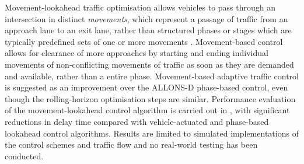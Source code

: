 Movement-lookahead traffic optimisation allows vehicles to pass through an intersection in distinct \emph{movements}, which represent a passage of traffic from an approach lane to an exit lane, rather than structured phases or stages which are typically predefined sets of one or more movements  \cite{van2008movement,pandit2013adaptive}. Movement-based control allows for clearance of more approaches by starting and ending individual movements of non-conflicting movements of traffic as soon as they are demanded and available, rather than a entire phase. Movement-based adaptive traffic control is suggested as an improvement over the ALLONS-D phase-based control, even though the rolling-horizon optimisation steps are similar. Performance evaluation of the movement-lookahead control algorithm is carried out in \cite{van2008movement}, with significant reductions in delay time compared with vehicle-actuated and phase-based lookahead control algorithms. Results are limited to simulated implementations of the control schemes and traffic flow and no real-world testing has been conducted.








